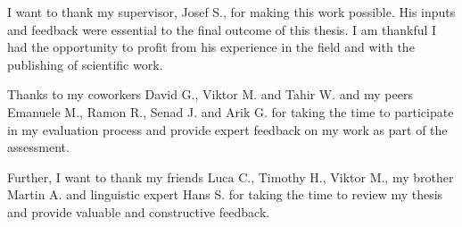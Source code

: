 \documentclass[../main.tex]{subfiles}
\begin{document}
    I want to thank my supervisor, Josef S., for making this work possible.
    His inputs and feedback were essential to the final outcome of this thesis.
    I am thankful I had the opportunity to profit from his experience in the field and with the publishing of scientific work.

    Thanks to my coworkers David G., Viktor M. and Tahir W. and my peers Emanuele M., Ramon R., Senad J. and Arik G. for taking the time to participate in my evaluation process and provide expert feedback on my work as part of the assessment.

    Further, I want to thank my friends Luca C., Timothy H., Viktor M., my brother Martin A. and linguistic expert Hans S. for taking the time to review my thesis and provide valuable and constructive feedback.
\end{document}
